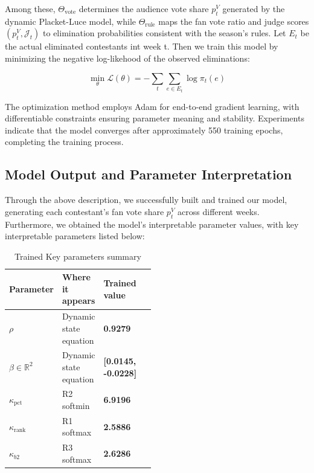 \documentclass[12pt]{article}
\begin{document}
Among these, $\Theta_{\text{vote}}$ determines the audience vote share $p_t^V$ generated by the dynamic Placket-Luce model, while $\Theta_{\text{rule}}$ maps the fan vote ratio and judge scores $(p_t^V, \mathcal{J}_t)$ to elimination probabilities consistent with the season's rules. Let $E_t$ be the actual eliminated contestants int week t. Then we train this model by minimizing the negative log-likehood of the observed eliminations:

\begin{equation}
  \min_{\theta} \mathcal{L}(\theta) = -\sum_{t} \sum_{e \in E_t} \log \pi_t(e)
\end{equation}

The optimization method employs Adam for end-to-end gradient learning, with differentiable constraints ensuring parameter meaning and stability. Experiments indicate that the model converges after approximately 550 training epochs, completing the training process.

\subsection{Model Output and Parameter Interpretation}

Through the above description, we successfully built and trained our model, generating each contestant's fan vote share $p_t^V$ across different weeks. Furthermore, we obtained the model's interpretable parameter values, with key interpretable parameters listed below:

\begin{table}[H]
  \centering
  \caption{Trained Key parameters summary}
  \label{tab:trained-params-summary}
  \renewcommand{\arraystretch}{1.15}
  \begin{tabularx}{\linewidth}{>{\raggedright\arraybackslash}m{0.22\linewidth} m{0.26\linewidth} X}
    \toprule
    Parameter & Where it appears & Trained value\\
    \midrule
    $\rho$ & Dynamic state equation & \textbf{0.9279} \\
    $\beta\in\mathbb{R}^2$ & Dynamic state equation & \textbf{[0.0145, -0.0228]}\\
    $\kappa_{\text{pct}}$ & R2 softmin & \textbf{6.9196} \\
    $\kappa_{\text{rank}}$ & R1 softmax & \textbf{2.5886} \\
    $\kappa_{b2}$ & R3 softmax & \textbf{2.6286}
  \end{tabularx}
\end{table}
\end{document}
